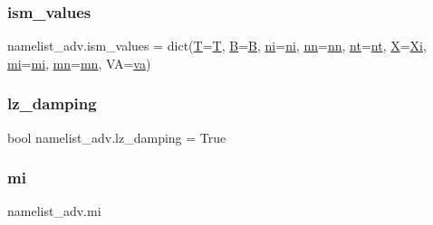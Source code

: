 \subsubsection{\texorpdfstring{ism\+\_\+values}{ism\_values}}
{\footnotesize\ttfamily namelist\+\_\+adv.\+ism\+\_\+values = dict(\hyperlink{namespacenamelist__adv_a6f719a9f9216dd79aade2fc13972f575}{T}=\hyperlink{namespacenamelist__adv_a6f719a9f9216dd79aade2fc13972f575}{T}, \hyperlink{namespacenamelist__adv_a375539f1a9c2e7e2e879f164603f4a93}{B}=\hyperlink{namespacenamelist__adv_a375539f1a9c2e7e2e879f164603f4a93}{B}, \hyperlink{namespacenamelist__adv_a8cdd5b152506f50859a6cae9348236b8}{ni}=\hyperlink{namespacenamelist__adv_a8cdd5b152506f50859a6cae9348236b8}{ni}, \hyperlink{namespacenamelist__adv_a4d7c79e9a8164cf6ac9127b3bcb80ee2}{nn}=\hyperlink{namespacenamelist__adv_a4d7c79e9a8164cf6ac9127b3bcb80ee2}{nn}, \hyperlink{namespacenamelist__adv_a28d50a79e884d95eb5fccdb1192fccab}{nt}=\hyperlink{namespacenamelist__adv_a28d50a79e884d95eb5fccdb1192fccab}{nt}, \hyperlink{namespacenamelist__adv_a5e3fd8ce9424ffcd8cd805216d953ad0}{X}=\hyperlink{namespacenamelist__adv_abfdc4e4c18b25ee50148017055085bfe}{Xi}, \hyperlink{namespacenamelist__adv_af9c7e2f258f5cbbaa0e325a3d3e9b834}{mi}=\hyperlink{namespacenamelist__adv_af9c7e2f258f5cbbaa0e325a3d3e9b834}{mi}, \hyperlink{namespacenamelist__adv_a06880564a76b1cc2c258a72685de5306}{mn}=\hyperlink{namespacenamelist__adv_a06880564a76b1cc2c258a72685de5306}{mn}, VA=\hyperlink{namespacenamelist__adv_a85011932bf2e7b9c4321e9c8047f6190}{va})}

\mbox{\label{namespacenamelist__adv_a1e68def3e325a2fa30683ceda2cbacaa}} 
\subsubsection{\texorpdfstring{lz\+\_\+damping}{lz\_damping}}
{\footnotesize\ttfamily bool namelist\+\_\+adv.\+lz\+\_\+damping = True}

\mbox{\label{namespacenamelist__adv_af9c7e2f258f5cbbaa0e325a3d3e9b834}} 
\subsubsection{\texorpdfstring{mi}{mi}}
{\footnotesize\ttfamily namelist\+\_\+adv.\+mi}

